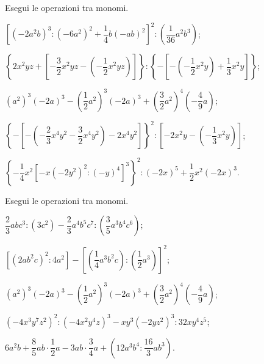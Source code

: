 \begin{esercizio}[\Ast]
 \label{ese:10.36} %
Esegui le operazioni tra monomi.

\begin{enumeratea}
 \item $\left[\left(-2a^2b\right)^3:\left(-6a^2\right)^2+\dfrac{1}{4}b(-ab)^2\right]^2:\left(\dfrac{1}{36}a^2b^3\right)$;
 \item $\left\lbrace 2x^2yz+\left[-\dfrac{3}{2}x^2yz-\left(-\dfrac{1}{2}x^2yz\right)\right] \right\rbrace:\left\lbrace-\left[-\left(-\dfrac{1}{2}x^2y\right)+\dfrac{1}{3}x^2y\right] \right\rbrace$;
 \item $\left(a^2\right)^3(-2a)^3-\left(\dfrac{1}{2}a^2\right)^3(-2a)^3+\left(\dfrac{3}{2}a^2\right)^4\left(-\dfrac{4}{9}a\right)$;
 \item $\left\lbrace-\left[-\left(-\dfrac{2}{3}x^4y^2-\dfrac{3}{2}x^4y^2\right)-2x^4y^2\right]\right\rbrace^2:\left[-2x^2y-\left(-\dfrac{1}{3}x^2y\right)\right]$;
 \item $\left\lbrace-\dfrac{1}{4}x^2\left[-x\left(-2y^2\right)^2:(-y)^4\right]^3 \right\rbrace^2:(-2x)^5+\dfrac{1}{2}x^2(-2x)^3$.
\end{enumeratea}
\end{esercizio}

\begin{esercizio}[\Ast]
 \label{ese:10.37} %
Esegui le operazioni tra monomi.

\begin{enumeratea}
 \item $\dfrac{2}{3}abc^3:\left(3c^2\right)-\dfrac{2}{3}a^4b^5c^7:\left(\dfrac{3}{5}a^3b^4c^6\right)$;
 \item $\left[\left(2ab^2c\right)^2:4a^2\right]-\left[\left(\dfrac{1}{4}a^3b^2c\right):\left(\dfrac{1}{2}a^3\right)\right]^2$;  \item $\left(a^2\right)^3(-2a)^3-\left(\dfrac{1}{2}a^2\right)^3(-2a)^3+\left(\dfrac{3}{2}a^2\right)^4\left(-\dfrac{4}{9}a\right)$;
 \item $\left(-4x^3y^7z^2\right)^2:\left(-4x^2y^4z\right)^3-xy^3\left(-2yz^2\right)^3:32xy^4z^5$;
 \item $6a^2b+\dfrac{8}{5}ab\cdot\dfrac{1}{2}a-3ab\cdot\dfrac{3}{4}a+\left(12a^3b^4:\dfrac{16}{3}ab^3\right)$.
\end{enumeratea}
\end{esercizio}

